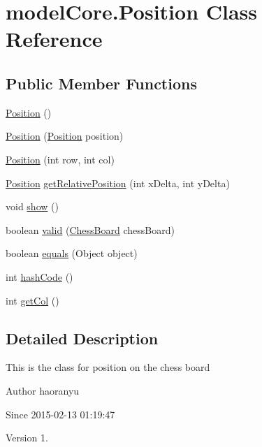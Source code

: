 \hypertarget{classmodel_core_1_1_position}{\section{model\+Core.\+Position Class Reference}
\label{classmodel_core_1_1_position}
}
\subsection*{Public Member Functions}
\begin{DoxyCompactItemize}
\item 
\hyperlink{classmodel_core_1_1_position_a689df995977dd8da01d733c5b0940e8b}{Position} ()
\item 
\hyperlink{classmodel_core_1_1_position_aaf7d9f851733f7e4361eadab881b5d1e}{Position} (\hyperlink{classmodel_core_1_1_position}{Position} position)
\item 
\hyperlink{classmodel_core_1_1_position_a9a5ab27a476a183a12f14b9644a74063}{Position} (int row, int col)
\item 
\hyperlink{classmodel_core_1_1_position}{Position} \hyperlink{classmodel_core_1_1_position_abfeb23711adcef25931cccff47e6f52a}{get\+Relative\+Position} (int x\+Delta, int y\+Delta)
\item 
void \hyperlink{classmodel_core_1_1_position_aa88918fe5d6446eb3c9f04c0b1ba92d0}{show} ()
\item 
boolean \hyperlink{classmodel_core_1_1_position_aeb1285fd0e8aa11728692d3a40c644f5}{valid} (\hyperlink{classmodel_core_1_1_chess_board}{Chess\+Board} chess\+Board)
\item 
boolean \hyperlink{classmodel_core_1_1_position_ad6cd6dc938426f8e328374e6130e51a6}{equals} (Object object)
\item 
int \hyperlink{classmodel_core_1_1_position_a87f61d46274b310c7c4edae150f20d89}{hash\+Code} ()
\item 
int \hyperlink{classmodel_core_1_1_position_a2e369524c690d77e4fe5a2f387d6351c}{get\+Col} ()
\end{DoxyCompactItemize}


\subsection{Detailed Description}
This is the class for position on the chess board \begin{DoxyAuthor}{Author}
haoranyu 
\end{DoxyAuthor}
\begin{DoxySince}{Since}
2015-\/02-\/13 01\+:19\+:47 
\end{DoxySince}
\begin{DoxyVersion}{Version}
1. 
\end{DoxyVersion}


